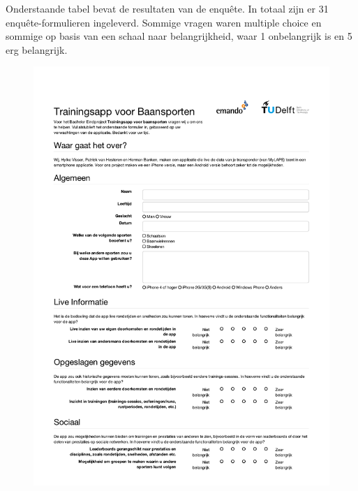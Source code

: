 \label{sec:enquete-resultaten}

Onderstaande tabel bevat de resultaten van de enquête. In totaal zijn er 31 enquête-formulieren ingeleverd. Sommige vragen waren multiple choice en sommige op basis van een schaal naar belangrijkheid, waar 1 onbelangrijk is en 5 erg belangrijk.

\begin{figure}[ht]
  \begin{center}
    \includegraphics[width=\textwidth]{style/images/Enquete1}
  \end{center}
  \label{fig:enquete1}
\end{figure}

